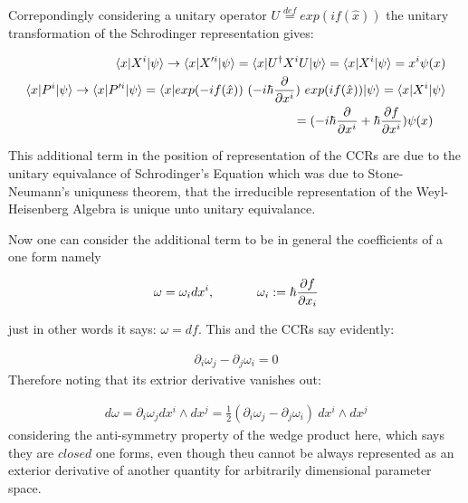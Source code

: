\documentclass[8pt, twocoloumn]{article}
\begin{document}
Correpondingly considering a unitary operator $U \overset{def}{=} exp(if(\hat{x}))$ the unitary transformation of the Schrodinger representation gives: 

\begin{align}
\begin{split}
\braket{x| X^i|\psi} \to \braket{x|X'^i|\psi} = \braket{x|U^{\dag}X^i U|\psi} = \braket{x| X^i|\psi} = x^i \psi(x)\notag
\end{split} \\
\begin{split}
\braket{x| P^i|\psi} \to \braket{x|P'^i|\psi} = \braket{x|exp(-if(\hat{x})) \ (-i\hbar \frac{\partial}{\partial x^i}) \ exp(if(\hat{x}))|\psi} = \braket{x| X^i|\psi} \notag
\end{split} \\
\begin{split}
={}& (-i\hbar \frac{\partial}{\partial x^i} + \hbar \frac{\partial f}{\partial x^i})\psi(x)
\end{split}
\end{align}

This additional term in the position of representation of the CCRs are due to the unitary equivalance of Schrodinger's Equation which was due to Stone-Neumann's uniquness theorem, that the irreducible representation of the Weyl-Heisenberg Algebra is unique unto unitary equivalance.

Now one can consider the additional term to be in general the coefficients of a one form namely 

\begin{align}{\label{huhuhuhu}}
\omega = \omega_i dx^i, \ \ \ \ \ \ \ \ \ \ \omega_i:=  \hbar \frac{\partial f}{\partial x_i}
\end{align}

just in other words it says: $\omega = df$. This and the CCRs say evidently:

\begin{align}
\partial_i \omega_j - \partial_j \omega_i = 0
\end{align}
Therefore noting that its extrior derivative vanishes out: 

\begin{align}
d\omega = \partial_i \omega_j dx^i \wedge dx^j
= \frac{1}{2}(\partial_i \omega_j - \partial_j \omega_i ) \ dx^i \wedge dx^j
\end{align} 
considering the anti-symmetry property of the wedge product here, which says they are $closed$ one forms, even though theu cannot be always represented as an exterior derivative of another quantity for arbitrarily dimensional parameter space. 
\end{document}
